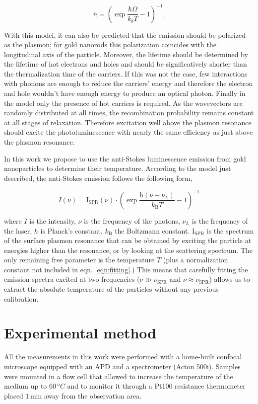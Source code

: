 \documentclass[journal=nalefd,manuscript=letter]{achemso}
\newcommand{\mm}{\ensuremath{\,\textrm{mm}}}
\begin{document}
\begin{equation}
	\bar{n}=\left(\exp\frac{\hbar\Omega}{k_bT}-1\right)^{-1}.
\end{equation}

With this model, it can also be predicted that the emission should be polarized
as the plasmon; for gold nanorods this polarization coincides with the
longitudinal axis of the particle\cite{He2015}. Moreover, the lifetime should be
determined by the lifetime of hot electrons and holes and should be
significatively shorter than the thermalization time of the carriers. If this
was not the case, few interactions with phonons are enough to reduce the
carriers' energy and therefore the electron and hole wouldn't have enough energy
to produce an optical photon. Finally in the model only the presence of hot
carriers is required. As the wavevectors are randomly distributed at all times,
the recombination probability remains constant at all stages of relaxation.
Therefore excitation well above the plasmon resonance should excite the
photoluminescence with nearly the same efficiency as just above the plasmon
resonance.

In this work we propose to use the anti-Stokes luminescence emission from gold
nanoparticles to determine their temperature. According to the model just
described, the anti-Stokes emission follows the following form,

\begin{equation}\label{eqn:fitting}
	I(\nu) =
	\textrm{I}_{\textrm{SPR}}(\nu)\cdot\left(\exp\frac{\textrm{h}(\nu-\nu_L)}{k_\textrm{B}T}-1\right)^{-1}
\end{equation}

where $I$ is the intensity, $\nu$ is the frequency of the photons, $\nu_L$ is
the frequency of the laser, $h$ is Planck's constant, $k_\textrm{B}$ the
Boltzmann constant. $\textrm{I}_{\textrm{SPR}}$ is the spectrum of the surface
plasmon resonance that can be obtained by exciting the particle at energies
higher than the resonance, or by looking at the scattering spectrum. The only
remaining free parameter is the temperature $T$ (plus a normalization constant
not included in eqn. \ref{eqn:fitting}.) This means that carefully fitting the
emission spectra excited at two frequencies ($\nu\gg\nu_{\textrm{SPR}}$ and
$\nu\approx\nu_{\textrm{SPR}}$) allows us to extract the absolute temperature of
the particles without any previous calibration.

\section{Experimental method}
All the measurements in this work were performed with a home-built confocal
microscope equipped with an APD and a spectrometer (Acton 500i). Samples were
mounted in a flow cell that allowed to increase the temperature of the medium up
to $60\,^oC$ and to monitor it through a Pt100 resistance thermometer placed
$1\mm$ away from the observation area.
\end{document}
